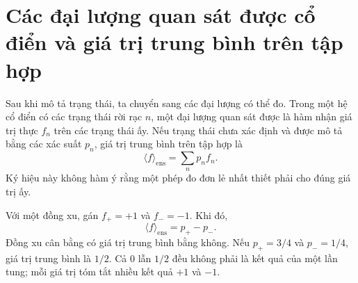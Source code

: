 \begin{classroomqa}
\end{classroomqa}

\section{Các đại lượng quan sát được cổ điển và giá trị trung bình trên tập hợp}

Sau khi mô tả trạng thái, ta chuyển sang các đại lượng có thể đo. Trong một hệ cổ điển có các trạng thái rời rạc \(n\), một đại lượng quan sát được là hàm nhận giá trị thực \(f_n\) trên các trạng thái ấy. Nếu trạng thái chưa xác định và được mô tả bằng các xác suất \(p_n\), giá trị trung bình trên tập hợp là
\begin{equation}
  \langle f\rangle_{\mathrm{ens}}
  =\sum_n p_n f_n.
  \label{eq:l02-classical-expectation}
\end{equation}
Ký hiệu này không hàm ý rằng một phép đo đơn lẻ nhất thiết phải cho đúng giá trị ấy.

Với một đồng xu, gán \(f_+=+1\) và \(f_-=-1\). Khi đó,
\begin{equation}
  \langle f\rangle_{\mathrm{ens}}
  =p_+-p_-.
  \label{eq:l02-coin-expectation}
\end{equation}
Đồng xu cân bằng có giá trị trung bình bằng không. Nếu \(p_+=3/4\) và \(p_-=1/4\), giá trị trung bình là \(1/2\). Cả \(0\) lẫn \(1/2\) đều không phải là kết quả của một lần tung; mỗi giá trị tóm tắt nhiều kết quả \(+1\) và \(-1\).

\begin{classroomqa}
\end{classroomqa}

